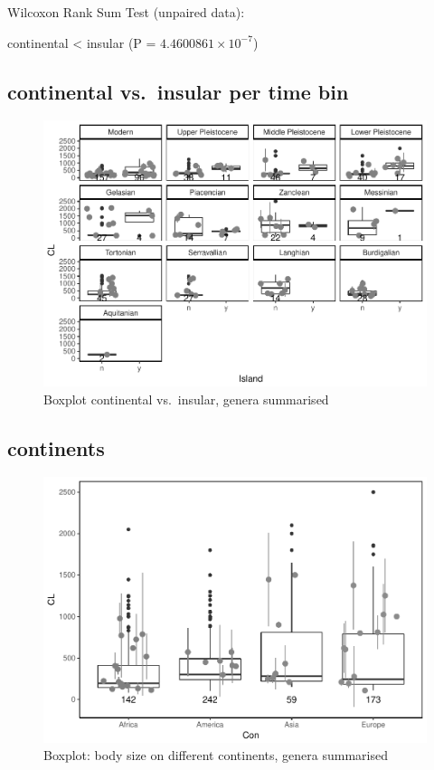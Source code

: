 \documentclass[]{article}
\begin{document}
Wilcoxon Rank Sum Test (unpaired data):

continental \textless{} insular (P = \(4.4600861\times 10^{-7}\))

\newpage

\subsection{continental vs.~insular per time
bin}\label{continental-vs.insular-per-time-bin-1}

\begin{figure}[htbp]
\centering
\includegraphics{MA_JJ_files/figure-latex/Boxplot continental vs. insular, split into time bins-1.pdf}
\caption{Boxplot continental vs.~insular, genera summarised}
\end{figure}

\newpage

\subsection{continents}\label{continents-1}

\begin{figure}[htbp]
\centering
\includegraphics{MA_JJ_files/figure-latex/Boxplot body size split into continents-1.pdf}
\caption{Boxplot: body size on different continents, genera summarised}
\end{figure}
\end{document}
